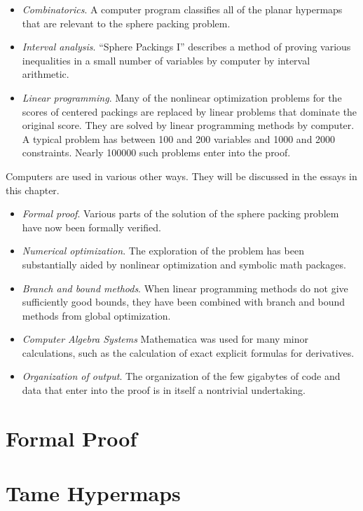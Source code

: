 \begin{itemize}
\item  {\it Combinatorics}.  A computer program classifies all of the planar hypermaps
that are relevant to the sphere packing problem.
\item {\it  Interval analysis}.  ``Sphere Packings
I'' describes a method of proving various inequalities in a small number
of variables by computer by interval arithmetic.
\item {\it  Linear programming}.  Many of the nonlinear optimization
    problems for the scores of centered packings are replaced by linear
    problems that dominate the original score.  They are solved
    by linear programming methods by computer.  A typical problem has
    between 100 and 200 variables and 1000 and 2000 constraints.  Nearly
    100000
    such problems enter into the proof.
\end{itemize}

Computers are used in various other ways.  They will be
discussed in the essays in this chapter.


\begin{itemize}
\item {\it Formal proof}.
    Various parts of the solution of the sphere packing problem have now been
    formally verified.
\item  {\it Numerical optimization}.  The exploration of the problem
    has been substantially
    aided by nonlinear optimization and symbolic math packages.
\item {\it Branch and bound methods}.  When linear programming methods do not
    give sufficiently good bounds, they have been combined with branch
    and bound methods from global optimization.
\item {\it Computer Algebra Systems}  Mathematica was used for many minor calculations,
  such as the calculation of exact  explicit formulas for derivatives.
\item {\it Organization of output}.
    The organization of the few gigabytes of code and data that
    enter into the proof is in itself a nontrivial undertaking.
\end{itemize}



\section{Formal Proof}

\clearpage
\section{Tame Hypermaps}



